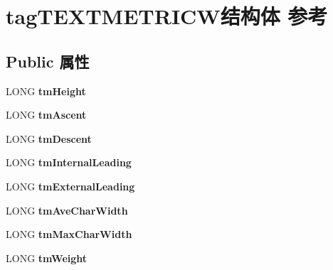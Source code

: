 \hypertarget{structtag_t_e_x_t_m_e_t_r_i_c_w}{}\section{tag\+T\+E\+X\+T\+M\+E\+T\+R\+I\+C\+W结构体 参考}
\label{structtag_t_e_x_t_m_e_t_r_i_c_w}
\subsection*{Public 属性}
\begin{DoxyCompactItemize}
\item 
\mbox{\label{structtag_t_e_x_t_m_e_t_r_i_c_w_ad9ff68f0b4b405c1b1e1779d37a4f671}} 
L\+O\+NG {\bfseries tm\+Height}
\item 
\mbox{\label{structtag_t_e_x_t_m_e_t_r_i_c_w_a68ade11bfb28152ba3ae1647aff4cf1e}} 
L\+O\+NG {\bfseries tm\+Ascent}
\item 
\mbox{\label{structtag_t_e_x_t_m_e_t_r_i_c_w_ae60a1976dffe3aea54d91ad5ecf1dbbb}} 
L\+O\+NG {\bfseries tm\+Descent}
\item 
\mbox{\label{structtag_t_e_x_t_m_e_t_r_i_c_w_a7b0532f1d24c56d5f0e53c302cb4950f}} 
L\+O\+NG {\bfseries tm\+Internal\+Leading}
\item 
\mbox{\label{structtag_t_e_x_t_m_e_t_r_i_c_w_a964d520d2177419940a5a9ca640ce556}} 
L\+O\+NG {\bfseries tm\+External\+Leading}
\item 
\mbox{\label{structtag_t_e_x_t_m_e_t_r_i_c_w_a63e01dc8e01c79e041a5e4c44042104e}} 
L\+O\+NG {\bfseries tm\+Ave\+Char\+Width}
\item 
\mbox{\label{structtag_t_e_x_t_m_e_t_r_i_c_w_a6b4c223cfe62ad21f271f235408b4f29}} 
L\+O\+NG {\bfseries tm\+Max\+Char\+Width}
\item 
\mbox{\label{structtag_t_e_x_t_m_e_t_r_i_c_w_a9df14a577904216572dd215a7d97a153}} 
L\+O\+NG {\bfseries tm\+Weight}

\end{DoxyCompactItemize}
